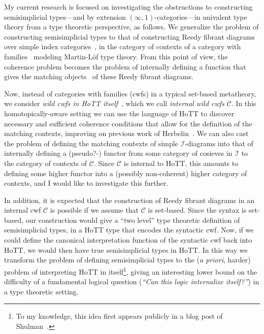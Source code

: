 \documentclass[a4paper]{article}
\newcommand{\C}{\mathcal C}
\newcommand{\I}{\mathcal I}
\begin{document}
My current research is focused on investigating the obstructions to constructing semisimplicial types---and by extension $(\infty, 1)$-categories---in univalent type theory from a type theoretic perspective, as follows.
We generalize the problem of constructing semisimplicial types to that of constructing Reedy fibrant diagrams~\cite{riehl:14:cat-homotopy-theory,riehl-verity:14:tap-reedy-categories} over simple index categories~\cite{makkai:95:folds}, in the category of contexts of a category with families~\cite{dybjer:96:internal-tt} modeling Martin-L\"{o}f type theory.
From this point of view, the coherence problem becomes the problem of internally defining a function that gives the matching objects~\cite{cite} of these Reedy fibrant diagrams.

Now, instead of categories with families (cwfs) in a typical set-based metatheory, we consider \emph{wild cwfs in HoTT itself}~\cite{cite}, which we call \emph{internal wild cwfs} $\C$.
In this homotopically-aware setting we can use the language of HoTT to discover necessary and sufficient coherence conditions that allow for the definition of the matching contexts, improving on previous work of Herbelin~\cite{herbelin:15:semisimplicial}.
We can also cast the problem of defining the matching contexts of simple $\I$-diagrams into that of internally defining a (pseudo?-) functor from some category of cosieves in $\I$ to the category of contexts of $\C$.
Since $\C$ is internal to HoTT, this amounts to defining some higher functor into a (possibly non-coherent) higher category of contexts, and I would like to investigate this further.

In addition, it is expected that the construction of Reedy fibrant diagrams in an internal cwf $\C$ is possible if we assume that $\C$ is set-based.
Since the syntax is set-based, our construction would give a ``two level'' type theoretic definition of semisimplicial types, in a HoTT type that encodes the syntactic cwf.
Now, if we could define the canonical interpretation function of the syntactic cwf back into HoTT, we would then have true semisimplicial types in HoTT.
In this way we transform the problem of defining semisimplicial types to the (\textit{a priori}, harder) problem of interpreting HoTT in itself\footnote{To my knowledge, this idea first appears publicly in a blog post of Shulman~\cite{shulman:14:hott-should-eat-itself}.}, giving an interesting lower bound on the difficulty of a fundamental logical question (\textit{``Can this logic internalize itself?''}) in a type theoretic setting.
\end{document}
